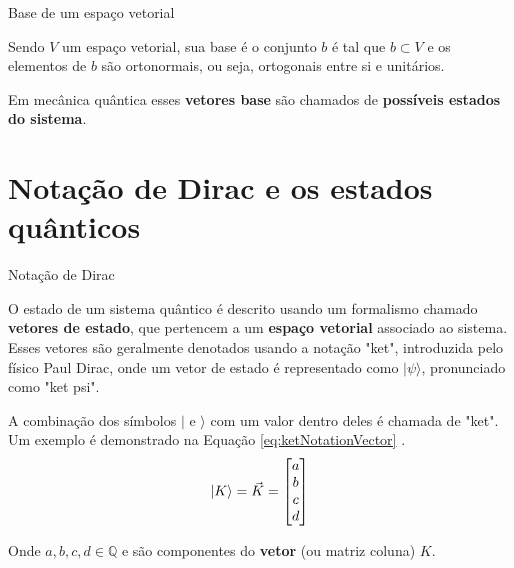	\begin{frame}{Base de um espaço vetorial}
		\par Sendo $V$ um espaço vetorial, sua base é o conjunto $b$ é tal que $b \subset V$ e os elementos de $b$ são ortonormais, ou seja, ortogonais entre si e unitários. \newline
		\par Em mecânica quântica esses \textbf{vetores base} são chamados de \textbf{possíveis estados do sistema}.
	\end{frame}

	\section{Notação de Dirac e os estados quânticos}

	\begin{frame}{Notação de Dirac}
		\par O estado de um sistema quântico é descrito usando um formalismo chamado \textbf{vetores de estado}, que pertencem a um \textbf{espaço vetorial} associado ao sistema. Esses vetores são geralmente denotados usando a notação "ket", introduzida pelo físico Paul Dirac, onde um vetor de estado é representado como $|\psi\rangle$, pronunciado como "ket psi".\newline
		\par A combinação dos símbolos $|$ e $\rangle$ com um valor dentro deles é chamada de "ket". Um exemplo é demonstrado na Equação \ref{eq:ketNotationVector} \cite{notacaoDirac}.
		\begin{equation}
			\ket{K} = \vec{K} = \begin{bmatrix}
				a \\
				b \\
				c \\
				d
			\end{bmatrix}
			\label{eq:ketNotationVector}
		\end{equation}
		\par Onde $a, b, c, d \in \mathbb{Q}$ e são componentes do \textbf{vetor} (ou matriz coluna) $K$.
	\end{frame}


